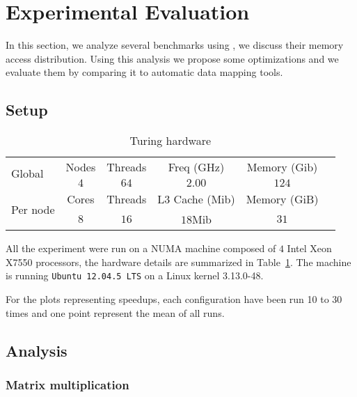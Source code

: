 
\section{Experimental Evaluation}
\label{sec:expe}

In this section, we analyze several benchmarks using \TABARNAC, we discuss
their memory access distribution. Using this analysis we propose some
optimizations and we evaluate them by comparing it to automatic data mapping
tools.

\subsection{Setup}
\label{sec:expe-setup}

\begin{table}
    \centering
        \begin{tabular}{|l|c|c|c|c|c|}
            \hline
            \multirow{2}{*}{Global} & Nodes & Threads & Freq (GHz) & Memory (Gib) \\
            \cline{2-5}
                & $4$   & $64$ & $2.00$ & $124$ \\
            \hline
           \multirow{2}{*}{Per node} & Cores & Threads & L3 Cache (Mib) & Memory (GiB) \\
            \cline{2-5}
            & $8$ & $16$ & $18$Mib & $31$  \\
            \hline
        \end{tabular}
    \caption{Turing hardware}
    \label{tab:turing}
\end{table}

All the experiment were run on a NUMA machine composed of $4$ Intel Xeon X7550
processors, the hardware details are summarized in Table~\ref{tab:turing}.
The machine is running \texttt{Ubuntu 12.04.5 LTS} on a Linux kernel 3.13.0-48.

For the plots representing speedups, each configuration have been run 10 to 30
times and one point represent the mean of all runs.

\subsection{Analysis}
\label{sec:expe-analysis}

\subsubsection{Matrix multiplication}
\label{sec:exp-mat}

